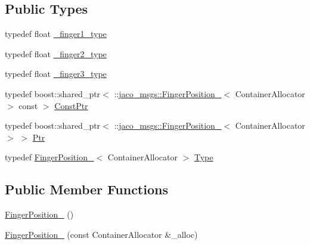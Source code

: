 \subsection*{Public Types}
\begin{DoxyCompactItemize}
\item 
typedef float \hyperlink{structjaco__msgs_1_1FingerPosition___ac5de244eb53b4bb0d3407b07b5769b8b}{\+\_\+finger1\+\_\+type}
\item 
typedef float \hyperlink{structjaco__msgs_1_1FingerPosition___afef383694b756f484b98bdd8d8b4c945}{\+\_\+finger2\+\_\+type}
\item 
typedef float \hyperlink{structjaco__msgs_1_1FingerPosition___a0efba96ee62a6a41fe83c572572a4170}{\+\_\+finger3\+\_\+type}
\item 
typedef boost\+::shared\+\_\+ptr$<$ \+::\hyperlink{structjaco__msgs_1_1FingerPosition__}{jaco\+\_\+msgs\+::\+Finger\+Position\+\_\+}$<$ Container\+Allocator $>$ const  $>$ \hyperlink{structjaco__msgs_1_1FingerPosition___aa5251615a131d806203aed481d508ed1}{Const\+Ptr}
\item 
typedef boost\+::shared\+\_\+ptr$<$ \+::\hyperlink{structjaco__msgs_1_1FingerPosition__}{jaco\+\_\+msgs\+::\+Finger\+Position\+\_\+}$<$ Container\+Allocator $>$ $>$ \hyperlink{structjaco__msgs_1_1FingerPosition___aca153f29d4b020d2c62e54833c3e83bc}{Ptr}
\item 
typedef \hyperlink{structjaco__msgs_1_1FingerPosition__}{Finger\+Position\+\_\+}$<$ Container\+Allocator $>$ \hyperlink{structjaco__msgs_1_1FingerPosition___a06fcb3aa502633f3f8ce415b3d2c7b7b}{Type}
\end{DoxyCompactItemize}
\subsection*{Public Member Functions}
\begin{DoxyCompactItemize}
\item 
\hyperlink{structjaco__msgs_1_1FingerPosition___af14a9baa194db80f15ef09685a64c8d2}{Finger\+Position\+\_\+} ()
\item 
\hyperlink{structjaco__msgs_1_1FingerPosition___ac9a874e396470cca48ba8d83f0295341}{Finger\+Position\+\_\+} (const Container\+Allocator \&\+\_\+alloc)
\end{DoxyCompactItemize}
